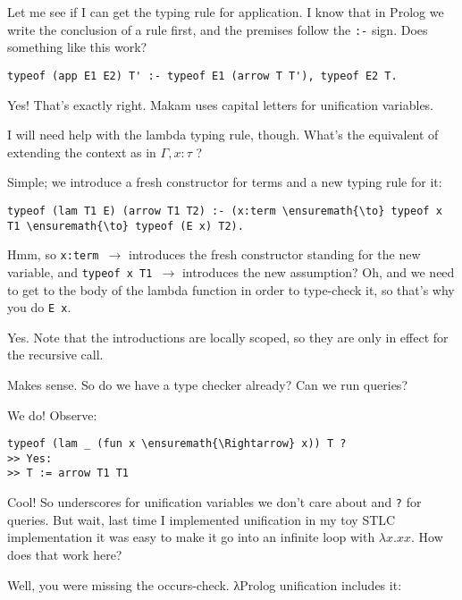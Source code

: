 \heroSTUDENT{} Let me see if I can get the typing rule for application. I know
that in Prolog we write the conclusion of a rule first, and the premises
follow the \texttt{:-} sign. Does something like this work?

\begin{verbatim}
typeof (app E1 E2) T' :- typeof E1 (arrow T T'), typeof E2 T.
\end{verbatim}

\heroADVISOR{} Yes! That's exactly right. Makam uses capital letters for
unification variables.

\heroSTUDENT{} I will need help with the lambda typing rule, though. What's
the equivalent of extending the context as in \(\Gamma, x : \tau\) ?

\heroADVISOR{} Simple; we introduce a fresh constructor for terms and a new
typing rule for it:

\begin{verbatim}
typeof (lam T1 E) (arrow T1 T2) :- (x:term \ensuremath{\to} typeof x T1 \ensuremath{\to} typeof (E x) T2).
\end{verbatim}

\heroSTUDENT{} Hmm, so \texttt{x:term\ \ensuremath{\to}} introduces the fresh
constructor standing for the new variable, and
\texttt{typeof\ x\ T1\ \ensuremath{\to}} introduces the new assumption?
Oh, and we need to get to the body of the lambda function in order to
type-check it, so that's why you do \texttt{E\ x}.

\heroADVISOR{} Yes. Note that the introductions are locally scoped, so they
are only in effect for the recursive call.

\heroSTUDENT{} Makes sense. So do we have a type checker already? Can we run
queries?

\heroADVISOR{} We do! Observe:

\begin{verbatim}
typeof (lam _ (fun x \ensuremath{\Rightarrow} x)) T ?
>> Yes:
>> T := arrow T1 T1
\end{verbatim}

\heroSTUDENT{} Cool! So underscores for unification variables we don't care
about and \texttt{?} for queries. But wait, last time I implemented
unification in my toy STLC implementation it was easy to make it go into
an infinite loop with \(\lambda x. x x\). How does that work here?

\heroADVISOR{} Well, you were missing the occurs-check. \foreignlanguage{greek}{λ}Prolog unification
includes it:


